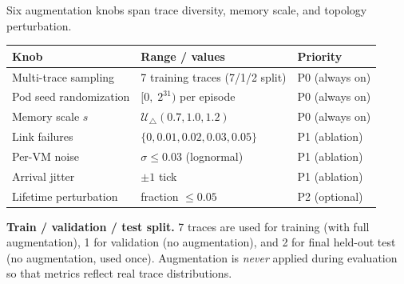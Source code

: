 \documentclass[11pt,aspectratio=43]{beamer}
\begin{document}
\begin{frame}{Six augmentation knobs span trace diversity, memory scale, and topology perturbation.}

  \begin{center}
  \small
  \begin{tabular}{lll}
    \toprule
    \textbf{Knob} & \textbf{Range / values} & \textbf{Priority} \\
    \midrule
    Multi-trace sampling    & 7 training traces (7/1/2 split)        & P0 (always on) \\
    Pod seed randomization  & $[0,\; 2^{31})$ per episode             & P0 (always on) \\
    Memory scale $s$        & $\mathcal{U}_\triangle(0.7, 1.0, 1.2)$ & P0 (always on) \\
    \midrule
    Link failures           & $\{0, 0.01, 0.02, 0.03, 0.05\}$       & P1 (ablation) \\
    Per-VM noise            & $\sigma \leq 0.03$ (lognormal)         & P1 (ablation) \\
    Arrival jitter          & $\pm 1$ tick                           & P1 (ablation) \\
    \midrule
    Lifetime perturbation   & fraction $\leq 0.05$                   & P2 (optional) \\
    \bottomrule
  \end{tabular}
  \end{center}

  \vspace{0.6em}

  \textbf{Train / validation / test split.}
  7 traces are used for training (with full augmentation), 1 for validation (no augmentation),
  and 2 for final held-out test (no augmentation, used once).
  Augmentation is \emph{never} applied during evaluation so that metrics reflect real trace
  distributions.

  \vspace{0.4em}


\end{frame}

\end{document}
